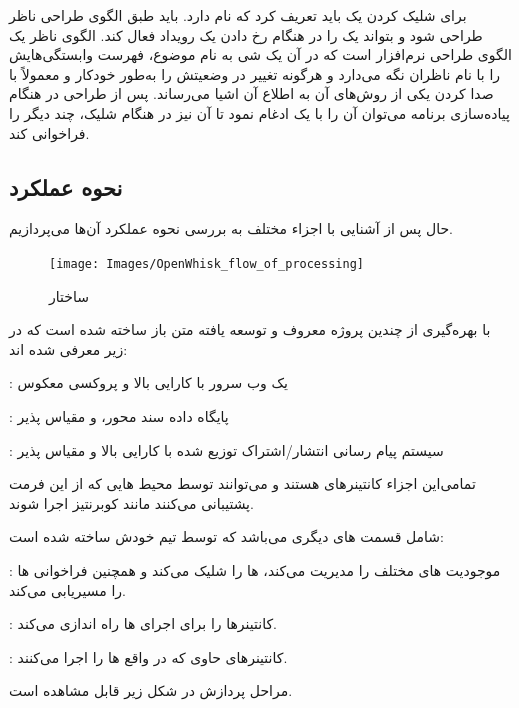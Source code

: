 برای شلیک کردن  یک  باید تعریف کرد که  نام دارد.  باید طبق الگوی طراحی ناظر طراحی شود و بتواند یک  را در هنگام رخ دادن یک رویداد فعال کند. الگوی ناظر یک الگوی طراحی نرم‌افزار است که در آن یک شی به نام موضوع، فهرست وابستگی‌هایش را با نام ناظران نگه می‌دارد و هرگونه تغییر در وضعیتش را به‌طور خودکار و معمولاً با صدا کردن یکی از روش‌های آن به اطلاع آن اشیا می‌رساند. پس از طراحی  در هنگام پیاده‌سازی برنامه می‌توان آن را با یک  ادغام نمود تا آن  نیز در هنگام شلیک، چند  دیگر را فراخوانی کند.

\subsection{نحوه عملکرد }

حال پس از آشنایی با اجزاء مختلف  به بررسی نحوه عملکرد آن‌ها می‌پردازیم.

\begin{figure}[!h]
	\centering
	\texttt{[image: Images/OpenWhisk\_flow\_of\_processing]}
	\caption{ساختار }
	\label{تصویر 2-1}
\end{figure}

 با بهره‌گیری از چندین پروژه معروف و توسعه یافته متن باز ساخته شده است که در زیر معرفی شده اند:

\textbf{} : یک وب سرور با کارایی بالا و پروکسی معکوس

\textbf{} : پایگاه داده سند محور،  و مقیاس پذیر

\textbf{} : سیستم پیام رسانی انتشار/اشتراک توزیع شده با کارایی بالا و مقیاس پذیر

تمامی‌این اجزاء کانتینرهای  هستند و می‌توانند توسط محیط هایی که از این فرمت پشتیبانی می‌کنند مانند کوبرنتیز اجرا شوند.

 شامل قسمت های دیگری می‌باشد که توسط تیم خودش ساخته شده است:

\textbf{} : موجودیت های مختلف را مدیریت می‌کند،  ها را شلیک می‌کند و همچنین فراخوانی  ها را مسیریابی می‌کند.

\textbf{} : کانتینرها را برای اجرای  ها راه اندازی می‌کند.

\textbf{} : کانتینرهای حاوی  که در واقع  ها را اجرا می‌کنند.

مراحل پردازش  در شکل زیر قابل مشاهده است.

